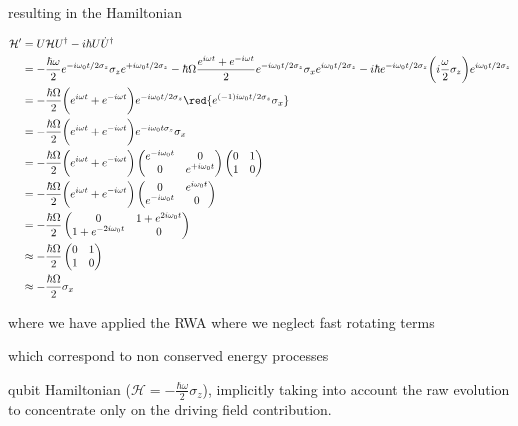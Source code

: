   \noindent resulting in the Hamiltonian

  \begin{equation}\label{app2New}
    \begin{aligned}
      \mathcal{H'} & = U\mathcal{H}U^{\dagger} - i\hbar U\dot{U}^{\dagger}\\
      & = -\frac{\hbar\omega}{2}e^{-i\omega_0t/2\sigma_z}\sigma_ze^{+i\omega_0t/2\sigma_z}-\hbar\Omega\frac{e^{i\omega t}+e^{-i\omega t}}{2}e^{-i\omega_0t/2\sigma_z}\sigma_xe^{i\omega_0t/2\sigma_z}- i\hbar e^{-i\omega_0t/2\sigma_z}\bigg(i\frac{\omega}{2}\sigma_z\bigg)e^{i\omega_0t/2\sigma_z}\\
      & = -\frac{\hbar\Omega}{2}\bigg(e^{i\omega t}+e^{-i\omega t}\bigg)e^{-i\omega_0t/2\sigma_z}\red{e^{(-1)i\omega_0t/2\sigma_z}\sigma_x}\\
      & = -\frac{\hbar\Omega}{2}\bigg(e^{i\omega t}+e^{-i\omega t}\bigg){e^{-i\omega_0t\sigma_z}\sigma_x}\\
      &      =-\frac{\hbar\Omega}{2}\bigg(e^{i\omega      t}+e^{-i\omega
        t}\bigg)\begin{pmatrix} e^{-i\omega_0t}&0\\0&e^{+i\omega_0t}
      \end{pmatrix}\begin{pmatrix}
        0&1\\1&0
      \end{pmatrix}\\
      &      =-\frac{\hbar\Omega}{2}\bigg(e^{i\omega      t}+e^{-i\omega
        t}\bigg)\begin{pmatrix} 0&e^{i\omega_0t}\\e^{-i\omega_0t}&0
      \end{pmatrix}
      \\
      &                           =-\frac{\hbar\Omega}{2}\begin{pmatrix}
        0&1+e^{2i\omega_0t}\\1+e^{-2i\omega_0t}&0
      \end{pmatrix}
      \\
      & \approx -\frac{\hbar\Omega}{2}\begin{pmatrix} 0&1\\1&0
      \end{pmatrix}
      \\
      & \approx -\frac{\hbar\Omega}{2}\sigma_x
    \end{aligned}
  \end{equation}

  \noindent where we have applied the RWA where we neglect fast rotating
  terms \begin{framed}\noindent which correspond to non conserved energy
    processes
  \end{framed}                     qubit                     Hamiltonian
  ($ \mathcal{H} =  -\frac{\hbar\omega}{2}\sigma_z $), implicitly taking
  into  account the  raw evolution  to concentrate  only on  the driving
  field contribution.

